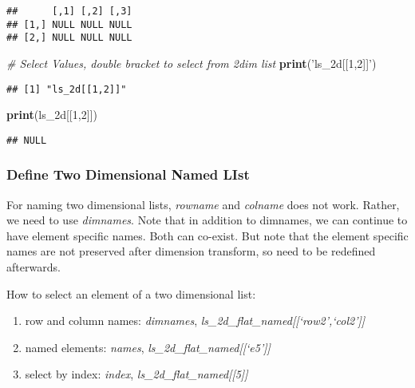\documentclass[
]{book}
\newenvironment{Shaded}{\begin{snugshade}}{\end{snugshade}}
\newcommand{\CommentTok}[1]{\textcolor[rgb]{0.56,0.35,0.01}{\textit{#1}}}
\newcommand{\DecValTok}[1]{\textcolor[rgb]{0.00,0.00,0.81}{#1}}
\newcommand{\KeywordTok}[1]{\textcolor[rgb]{0.13,0.29,0.53}{\textbf{#1}}}
\newcommand{\NormalTok}[1]{#1}
\newcommand{\StringTok}[1]{\textcolor[rgb]{0.31,0.60,0.02}{#1}}
\providecommand{\tightlist}{%
  \setlength{\itemsep}{0pt}\setlength{\parskip}{0pt}}
\begin{document}
\begin{verbatim}
##      [,1] [,2] [,3]
## [1,] NULL NULL NULL
## [2,] NULL NULL NULL
\end{verbatim}

\begin{Shaded}
\begin{Highlighting}[]
\CommentTok{# Select Values, double bracket to select from 2dim list}
\KeywordTok{print}\NormalTok{(}\StringTok{'ls_2d[[1,2]]'}\NormalTok{)}
\end{Highlighting}
\end{Shaded}

\begin{verbatim}
## [1] "ls_2d[[1,2]]"
\end{verbatim}

\begin{Shaded}
\begin{Highlighting}[]
\KeywordTok{print}\NormalTok{(ls_2d[[}\DecValTok{1}\NormalTok{,}\DecValTok{2}\NormalTok{]])}
\end{Highlighting}
\end{Shaded}

\begin{verbatim}
## NULL
\end{verbatim}

\hypertarget{define-two-dimensional-named-list}{%
\subsubsection{Define Two Dimensional Named LIst}\label{define-two-dimensional-named-list}}

For naming two dimensional lists, \emph{rowname} and \emph{colname} does not work. Rather, we need to use \emph{dimnames}. Note that in addition to dimnames, we can continue to have element specific names. Both can co-exist. But note that the element specific names are not preserved after dimension transform, so need to be redefined afterwards.

How to select an element of a two dimensional list:

\begin{enumerate}
\def\labelenumi{\arabic{enumi}.}
\tightlist
\item
  row and column names: \emph{dimnames}, \emph{ls\_2d\_flat\_named{[}{[}`row2',`col2'{]}{]}}
\item
  named elements: \emph{names}, \emph{ls\_2d\_flat\_named{[}{[}`e5'{]}{]}}
\item
  select by index: \emph{index}, \emph{ls\_2d\_flat\_named{[}{[}5{]}{]}}
\end{enumerate}
\end{document}

